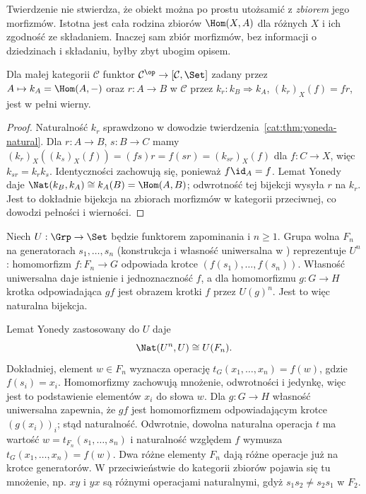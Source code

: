 \begin{uwaga}
Twierdzenie nie stwierdza, że obiekt można po prostu utożsamić z \emph{zbiorem} jego morfizmów. Istotna jest cała rodzina zbiorów $\Hom(X,A)$ dla różnych $X$ i ich zgodność ze składaniem. Inaczej sam zbiór morfizmów, bez informacji o dziedzinach i składaniu, byłby zbyt ubogim opisem.
\end{uwaga}

\begin{stwierdzenie}\label{cat:prop:yoneda-cov-embedding}
Dla małej kategorii $\mathcal C$ funktor $\mathcal C^{\op}\to[\mathcal C,\Set]$ zadany przez $A\mapsto k_A=\Hom(A,-)$ oraz $r:A\to B$ w $\mathcal C$ przez $k_r:k_B\Rightarrow k_A$, $(k_r)_X(f)=fr$, jest w pełni wierny.
\end{stwierdzenie}
\begin{proof}
Naturalność $k_r$ sprawdzono w dowodzie twierdzenia~\ref{cat:thm:yoneda-natural}. Dla $r:A\to B$, $s:B\to C$ mamy $(k_r)_X((k_s)_X(f))=(fs)r=f(sr)=(k_{sr})_X(f)$ dla $f:C\to X$, więc $k_{sr}=k_rk_s$. Identyczności zachowują się, ponieważ $f\id_A=f$. Lemat Yonedy daje
$\Nat(k_B,k_A)\cong k_A(B)=\Hom(A,B)$; odwrotność tej bijekcji wysyła $r$ na $k_r$. Jest to dokładnie bijekcja na zbiorach morfizmów w kategorii przeciwnej, co dowodzi pełności i wierności.
\end{proof}

\begin{przyklad}\label{cat:ex:yoneda-group-words}
Niech $U:\Grp\to\Set$ będzie funktorem zapominania i $n\geq1$. Grupa wolna $F_n$ na generatorach $s_1,\ldots,s_n$ (konstrukcja i własność uniwersalna w ) reprezentuje $U^n$: homomorfizm $f:F_n\to G$ odpowiada krotce $(f(s_1),\ldots,f(s_n))$. Własność uniwersalna daje istnienie i jednoznaczność $f$, a dla homomorfizmu $g:G\to H$ krotka odpowiadająca $gf$ jest obrazem krotki $f$ przez $U(g)^n$. Jest to więc naturalna bijekcja.

Lemat Yonedy zastosowany do $U$ daje
\[
\Nat(U^n,U)\cong U(F_n).
\]
Dokładniej, element $w\in F_n$ wyznacza operację $t_G(x_1,\ldots,x_n)=f(w)$, gdzie $f(s_i)=x_i$. Homomorfizmy zachowują mnożenie, odwrotności i jedynkę, więc jest to podstawienie elementów $x_i$ do słowa $w$. Dla $g:G\to H$ własność uniwersalna zapewnia, że $gf$ jest homomorfizmem odpowiadającym krotce $(g(x_i))_i$; stąd naturalność. Odwrotnie, dowolna naturalna operacja $t$ ma wartość $w=t_{F_n}(s_1,\ldots,s_n)$ i naturalność względem $f$ wymusza $t_G(x_1,\ldots,x_n)=f(w)$. Dwa różne elementy $F_n$ dają różne operacje już na krotce generatorów. W przeciwieństwie do kategorii zbiorów pojawia się tu mnożenie, np. $xy$ i $yx$ są różnymi operacjami naturalnymi, gdyż $s_1s_2\ne s_2s_1$ w $F_2$.
\end{przyklad}
